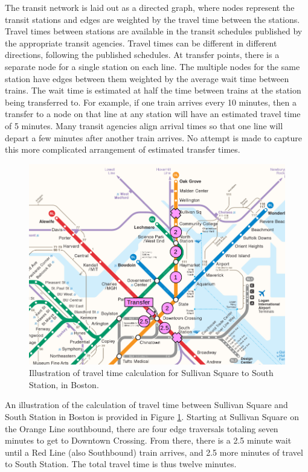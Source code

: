 \documentclass[11pt]{report}
\begin{document}
The transit network is laid out as a directed graph, where nodes represent the transit stations and edges are weighted by the travel time between the stations. Travel times between stations are available in the transit schedules published by the appropriate transit agencies. Travel times can be different in different directions, following the published schedules. At transfer points, there is a separate node for a single station on each line. The multiple nodes for the same station have edges between them weighted by the average wait time between trains. The wait time is estimated at half the time between trains at the station being transferred to. For example, if one train arrives every 10 minutes, then a transfer to a node on that line at any station will have an estimated travel time of 5 minutes. Many transit agencies align arrival times so that one line will depart a few minutes after another train arrives. No attempt is made to capture this more complicated arrangement of estimated transfer times. 

\begin{figure}
\begin{center}\includegraphics[scale=0.7]{transfer_demonstration}\end{center}\caption{Illustration of travel time calculation for Sullivan Square to South Station, in Boston.}\label{fig:f2}
\end{figure}

An illustration of the calculation of travel time between Sullivan Square and South Station in Boston is provided in Figure \ref{fig:f2}. Starting at Sullivan Square on the Orange Line southbound, there are four edge traversals totaling seven minutes to get to Downtown Crossing. From there, there is a 2.5 minute wait until a Red Line (also Southbound) train arrives, and 2.5 more minutes of travel to South Station. The total travel time is thus twelve minutes. 
\end{document}
